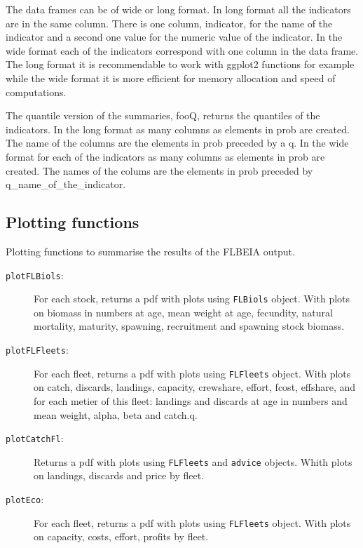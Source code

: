   The data frames can be of wide or long format. In long format all the indicators are in the same column. 
  There is one column, indicator, for the name of the indicator and a second one value for the numeric value of the indicator. 
  In the wide format each of the indicators correspond with one column in the data frame. 
  The long format it is recommendable to work with ggplot2 functions for example while the wide format it is more efficient for memory allocation and speed of computations.

  The quantile version of the summaries, fooQ, returns the quantiles of the indicators. 
  In the long format as many columns as elements in prob are created. The name of the columns are the elements in prob preceded by a q. 
  In the wide format for each of the indicators as many columns as elements in prob are created. The names of the colums are the elements in prob preceded by q\_name\_of\_the\_indicator.


\subsection{Plotting functions} 

  Plotting functions to summarise the results of the FLBEIA output.

  \begin{description}
    
    \item[\texttt{plotFLBiols}:] For each stock, returns a pdf with plots using \texttt{FLBiols} object. With plots on biomass in numbers at age, mean weight at age, fecundity, natural mortality, maturity, spawning, recruitment and spawning stock biomass.
    \item[\texttt{plotFLFleets}:] For each fleet, returns a pdf with plots using \texttt{FLFleets} object. With plots on catch, discards, landings, capacity, crewshare, effort, fcost, effshare, and for each metier of this fleet: landings and discards at age in numbers and mean weight, alpha, beta and catch.q.
    \item[\texttt{plotCatchFl}:] Returns a pdf with plots using \texttt{FLFleets} and \texttt{advice} objects. Whith plots on landings, discards and price by fleet.
    \item[\texttt{plotEco}:] For each fleet, returns a pdf with plots using \texttt{FLFleets} object. With plots on capacity, costs, effort, profits by fleet.
  
  \end{description}
  
